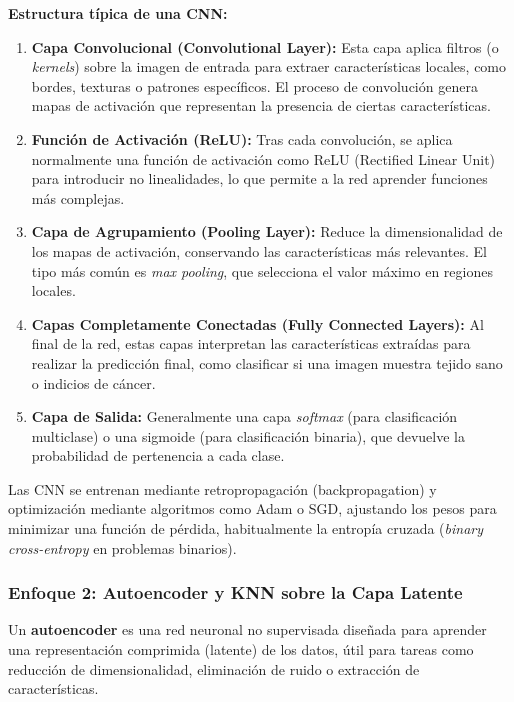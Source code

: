 \documentclass[12pt]{article} %
\begin{document}
\textbf{Estructura típica de una CNN:}
\begin{enumerate}
    \item \textbf{Capa Convolucional (Convolutional Layer):} Esta capa aplica filtros (o \textit{kernels}) sobre la imagen de entrada para extraer características locales, como bordes, texturas o patrones específicos. El proceso de convolución genera mapas de activación que representan la presencia de ciertas características.
    \item \textbf{Función de Activación (ReLU):} Tras cada convolución, se aplica normalmente una función de activación como ReLU (Rectified Linear Unit) para introducir no linealidades, lo que permite a la red aprender funciones más complejas.
    \item \textbf{Capa de Agrupamiento (Pooling Layer):} Reduce la dimensionalidad de los mapas de activación, conservando las características más relevantes. El tipo más común es \textit{max pooling}, que selecciona el valor máximo en regiones locales.
    \item \textbf{Capas Completamente Conectadas (Fully Connected Layers):} Al final de la red, estas capas interpretan las características extraídas para realizar la predicción final, como clasificar si una imagen muestra tejido sano o indicios de cáncer.
    \item \textbf{Capa de Salida:} Generalmente una capa \textit{softmax} (para clasificación multiclase) o una sigmoide (para clasificación binaria), que devuelve la probabilidad de pertenencia a cada clase.

\end{enumerate}

Las CNN se entrenan mediante retropropagación (backpropagation) y optimización mediante algoritmos como Adam o SGD, ajustando los pesos para minimizar una función de pérdida, habitualmente la entropía cruzada (\textit{binary cross-entropy} en problemas binarios).

\subsubsection{Enfoque 2: Autoencoder y KNN sobre la Capa Latente}
Un \textbf{autoencoder} es una red neuronal no supervisada diseñada para aprender una representación comprimida (latente) de los datos, útil para tareas como reducción de dimensionalidad, eliminación de ruido o extracción de características.
\end{document}
